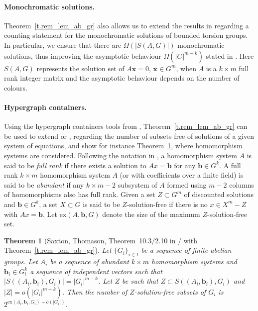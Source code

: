 \documentclass[10pt]{article}
\newtheorem{theorem}{Theorem}
\begin{document}
\paragraph{Monochromatic solutions.}

Theorem~\ref{t.rem_lem_ab_gr} also allows us to extend the results in \cite{serven14} regarding a counting statement for the monochromatic solutions of bounded torsion groups. In particular, we ensure that there are $\Omega\left(|S(A,G)|\right)$  monochromatic solutions, thus improving the asymptotic behaviour $\Omega\left(|G|^{m-k}\right)$ stated in \cite{serven14}. Here $S(A,G)$ represents the solution set of $A\mathbf{x}=0$, $\mathbf{x}\in G^m$, when $A$ is a $k\times m$ full rank integer matrix and the asymptotic behaviour depends on the number of colours.


\paragraph{Hypergraph containers.}


Using the hypergraph containers tools from \cite{saxtho13+},
 Theorem~\ref{t.rem_lem_ab_gr} can be used to extend  \cite[Theorem~10.3]{saxtho13+} or \cite[Theorem~2.10]{saxtho13+2}, regarding the number of subsets free of solutions of a given system of equations, and show for instance Theorem~\ref{t.saxtom+}, where homomorphism systems are considered. Following the notation in \cite{saxtho13+}, a homomorphism system $A$ is said to be \emph{full rank} if there exists a solution to $Ax=\mathbf{b}$ for any $\mathbf{b}\in G^k$. A full rank $k\times m$ homomorphism system $A$ (or with coefficients over a finite field) is said to be \emph{abundant} if any $k\times m-2$ subsystem of $A$ formed using $m-2$ columns of homomorphisms also has full rank. Given a set $Z\subset G^m$ of discounted solutions and $\mathbf{b}\in G^k$, a set $X\subset G$ is said to be $Z$-solution-free if there is no $x\in X^m-Z$ with $Ax=\mathbf{b}$. Let $\text{ex}(A,\mathbf{b},G)$ denote the size of the maximum $Z$-solution-free set.


\begin{theorem}[Saxton, Thomason, Theorem~10.3/2.10 in \cite{saxtho13+}/\cite{saxtho13+2} with Theorem~\ref{t.rem_lem_ab_gr}] \label{t.saxtom+}
	Let $\{G_i\}_{i\in I}$ be a sequence of finite abelian groups. Let $A_i$ be a sequence of abundant $k\times m$ homomorphism systems and $\mathbf{b}_i\in G_i^k$ a sequence of independent vectors such that $|S((A_i,\mathbf{b}_i),G_i)|=|G_i|^{m-k}$. Let 
	$Z$ be such that $Z\subset S((A_i,\mathbf{b}_i),G_i)$ and $|Z|=o(|G_i|^{m-k})$. Then the number of $Z$-solution-free subsets of $G_i$ is $2^{\text{ex}(A_i,\mathbf{b}_i,G_i)+o(|G_i|)}$.
\end{theorem}
\end{document}
